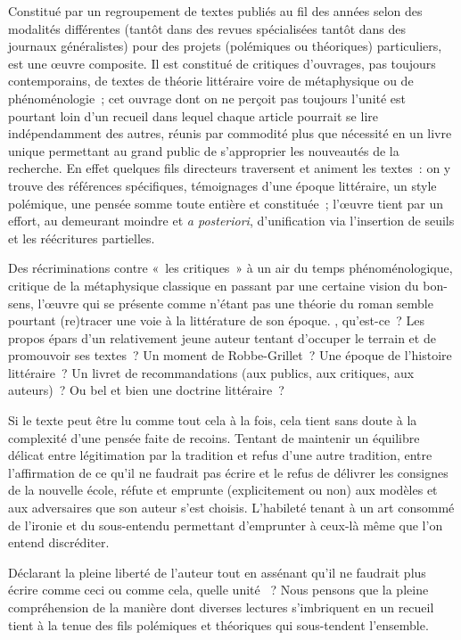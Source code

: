 \documentclass[12pt, a4paper]{article}
\begin{document}

Constitué par un regroupement de textes publiés au fil des années selon des modalités différentes (tantôt dans des revues spécialisées tantôt dans des journaux généralistes) pour des projets (polémiques ou théoriques) particuliers, \punr{} est une œuvre composite. Il est constitué de critiques d'ouvrages, pas toujours contemporains, de textes de théorie littéraire voire de métaphysique ou de phénoménologie~; cet ouvrage dont on ne perçoit pas toujours l'unité est pourtant loin d'un recueil dans lequel chaque article pourrait se lire indépendamment des autres, réunis par commodité plus que nécessité en un livre unique permettant au grand public de s'approprier les nouveautés de la recherche. En effet quelques fils directeurs traversent et animent les textes~: on y trouve des références spécifiques, témoignages d'une époque littéraire, un style polémique, une pensée somme toute entière et constituée~; l'œuvre tient par un effort, au demeurant moindre et \textit{a posteriori}, d'unification via l'insertion de seuils et les réécritures partielles.

Des récriminations contre «~les critiques~» à un air du temps phénoménologique, critique de la métaphysique classique en passant par une certaine vision du bon-sens, l'œuvre qui se présente comme n'étant pas une théorie du roman semble pourtant (re)tracer une voie à la littérature de son époque. \punr, qu'est-ce~? Les propos épars d'un relativement jeune auteur tentant d'occuper le terrain et de promouvoir ses textes~? Un moment de Robbe-Grillet~? Une époque de l'histoire littéraire~? Un livret de recommandations (aux publics, aux critiques, aux auteurs)~? Ou bel et bien une doctrine littéraire~?

Si le texte peut être lu comme tout cela à la fois, cela tient sans doute à la complexité d'une pensée faite de recoins. Tentant de maintenir un équilibre délicat entre légitimation par la tradition et refus d'une autre tradition, entre l'affirmation de ce qu'il ne faudrait pas écrire et le refus de délivrer les consignes de la nouvelle école, \punr{} réfute et emprunte (explicitement ou non) aux modèles et aux adversaires que son auteur s'est choisis. L'habileté tenant à un art consommé de l'ironie et du sous-entendu permettant d'emprunter à ceux-là même que l'on entend discréditer.

Déclarant la pleine liberté de l'auteur tout en assénant qu'il ne faudrait plus écrire comme ceci ou comme cela, quelle unité \punr~? Nous pensons que la pleine compréhension de la manière dont diverses lectures s'imbriquent en un recueil tient à la tenue des fils polémiques et théoriques qui sous-tendent l'ensemble. 
\end{document}
